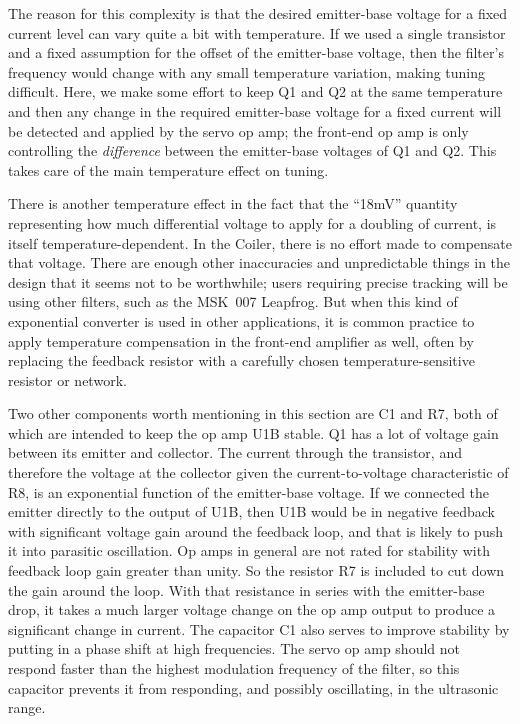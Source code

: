 The reason for this complexity is that the desired emitter-base voltage for
a fixed current level can vary quite a bit with temperature.  If we used a
single transistor and a fixed assumption for the offset of the emitter-base
voltage, then the filter's frequency would change with any small temperature
variation, making tuning difficult.  Here, we make some effort to keep Q1
and Q2 at the same temperature and then any change in the required
emitter-base voltage for a fixed current will be detected and applied by the
servo op amp; the front-end op amp is only controlling the \emph{difference}
between the emitter-base voltages of Q1 and Q2.  This takes care of the main
temperature effect on tuning.

There is another temperature effect in the fact that the ``18mV'' quantity
representing how much differential voltage to apply for a doubling of
current, is itself temperature-dependent.  In the Coiler, there is no effort
made to compensate that voltage.  There are enough other inaccuracies and
unpredictable things in the design that it seems not to be worthwhile; users
requiring precise tracking will be using other filters, such as the MSK~007
Leapfrog.  But when this kind of exponential converter is used in other
applications, it is common practice to apply temperature compensation in the
front-end amplifier as well, often by replacing the feedback resistor with a
carefully chosen temperature-sensitive resistor or network.

Two other components worth mentioning in this section are C1 and R7, both of
which are intended to keep the op amp U1B stable.  Q1 has a lot of voltage
gain between its emitter and collector.  The current through the transistor,
and therefore the voltage at the collector given the current-to-voltage
characteristic of R8, is an exponential function of the emitter-base
voltage.  If we connected the emitter directly to the output of U1B, then
U1B would be in negative feedback with significant voltage gain around the
feedback loop, and that is likely to push it into parasitic oscillation.  Op
amps in general are not rated for stability with feedback loop gain greater
than unity.  So the resistor R7 is included to cut down the gain around the
loop.  With that resistance in series with the emitter-base drop, it
takes a much larger voltage change on the op amp output to produce a
significant change in current.  The capacitor C1 also serves to improve
stability by putting in a phase shift at high frequencies.  The servo op amp
should not respond faster than the highest modulation frequency of the
filter, so this capacitor prevents it from responding, and possibly
oscillating, in the ultrasonic range.
